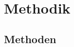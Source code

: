


\newcommand{\subsubsubsection}[1]{\paragraph{#1}\mbox{}\\}
\setcounter{secnumdepth}{4}
\setcounter{tocdepth}{4}




\part{Methodik}

\chapter{Methoden}
\label{cha:Einleitung}



\noindent




\newpage


\newpage


\newpage


\newpage

\newpage

\newpage




\newpage

	



\newpage





\newpage






